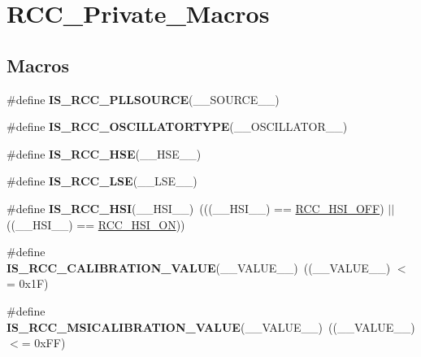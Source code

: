 \hypertarget{group___r_c_c___private___macros}{\section{R\-C\-C\-\_\-\-Private\-\_\-\-Macros}
\label{group___r_c_c___private___macros}
}
\subsection*{Macros}
\begin{DoxyCompactItemize}
\item 
\#define {\bfseries I\-S\-\_\-\-R\-C\-C\-\_\-\-P\-L\-L\-S\-O\-U\-R\-C\-E}(\-\_\-\-\_\-\-S\-O\-U\-R\-C\-E\-\_\-\-\_\-)
\item 
\#define {\bfseries I\-S\-\_\-\-R\-C\-C\-\_\-\-O\-S\-C\-I\-L\-L\-A\-T\-O\-R\-T\-Y\-P\-E}(\-\_\-\-\_\-\-O\-S\-C\-I\-L\-L\-A\-T\-O\-R\-\_\-\-\_\-)
\item 
\#define {\bfseries I\-S\-\_\-\-R\-C\-C\-\_\-\-H\-S\-E}(\-\_\-\-\_\-\-H\-S\-E\-\_\-\-\_\-)
\item 
\#define {\bfseries I\-S\-\_\-\-R\-C\-C\-\_\-\-L\-S\-E}(\-\_\-\-\_\-\-L\-S\-E\-\_\-\-\_\-)
\item 
\hypertarget{group___r_c_c___private___macros_ga230f351a740560f6b51cdc4b7051606e}{\#define {\bfseries I\-S\-\_\-\-R\-C\-C\-\_\-\-H\-S\-I}(\-\_\-\-\_\-\-H\-S\-I\-\_\-\-\_\-)~(((\-\_\-\-\_\-\-H\-S\-I\-\_\-\-\_\-) == \hyperlink{group___r_c_c___h_s_i___config_ga1b34d37d3b51afec0758b3ddc7a7e665}{R\-C\-C\-\_\-\-H\-S\-I\-\_\-\-O\-F\-F}) $\vert$$\vert$ ((\-\_\-\-\_\-\-H\-S\-I\-\_\-\-\_\-) == \hyperlink{group___r_c_c___h_s_i___config_ga0bf09ef9e46d5da25cced7b3122f92f5}{R\-C\-C\-\_\-\-H\-S\-I\-\_\-\-O\-N}))}\label{group___r_c_c___private___macros_ga230f351a740560f6b51cdc4b7051606e}

\item 
\hypertarget{group___r_c_c___private___macros_ga0811e1266f1690c9f967df0129cb9d66}{\#define {\bfseries I\-S\-\_\-\-R\-C\-C\-\_\-\-C\-A\-L\-I\-B\-R\-A\-T\-I\-O\-N\-\_\-\-V\-A\-L\-U\-E}(\-\_\-\-\_\-\-V\-A\-L\-U\-E\-\_\-\-\_\-)~((\-\_\-\-\_\-\-V\-A\-L\-U\-E\-\_\-\-\_\-) $<$= 0x1\-F)}\label{group___r_c_c___private___macros_ga0811e1266f1690c9f967df0129cb9d66}

\item 
\hypertarget{group___r_c_c___private___macros_gafddad15a3c57d33518053c9e6068d883}{\#define {\bfseries I\-S\-\_\-\-R\-C\-C\-\_\-\-M\-S\-I\-C\-A\-L\-I\-B\-R\-A\-T\-I\-O\-N\-\_\-\-V\-A\-L\-U\-E}(\-\_\-\-\_\-\-V\-A\-L\-U\-E\-\_\-\-\_\-)~((\-\_\-\-\_\-\-V\-A\-L\-U\-E\-\_\-\-\_\-) $<$= 0x\-F\-F)}\label{group___r_c_c___private___macros_gafddad15a3c57d33518053c9e6068d883}


\end{DoxyCompactItemize}
